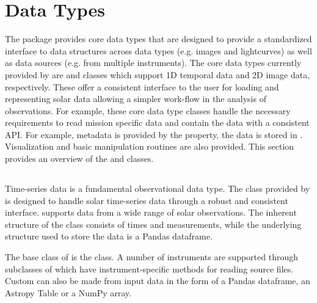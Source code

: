 \section{Data Types}
\label{sec:data_types}

The \sunpypkg package provides core data types that are designed to provide a standardized interface to data structures across data types (e.g. images and lightcurves) as well as data sources (e.g. from multiple instruments).
The core data types currently provided by \sunpypkg are \Timeseries and \Map classes which support 1D temporal data and 2D image data, respectively.
These offer a consistent interface to the user for loading and representing solar data allowing a simpler work-flow in the analysis of observations. 
For example, these core data type classes handle the necessary requirements to read mission specific data and contain the data with a consistent API. 
For example, metadata is provided by the  property, the data is stored in . 
Visualization and basic manipulation routines are also provided. 
This section provides an overview of the \Timeseries and \Map classes.

\subsection{\Timeseries}
\label{sec:timeseries}
Time-series data is a fundamental observational data type.
The \Timeseries class provided by \sunpypkg is designed to handle solar time-series data through a robust and consistent interface. 
\Timeseries supports data from a wide range of solar observations.
The inherent structure of the \Timeseries class consists of times and measurements, while the underlying structure used to store the data is a Pandas dataframe. 


The base class of \Timeseries is the \GenericTimeSeries class. 
A number of instruments are supported through subclasses of \GenericTimeSeries which have instrument-specific methods for reading source files.
Custom \Timeseries can also be made from input data in the form of a Pandas dataframe, an Astropy Table or a NumPy array.

